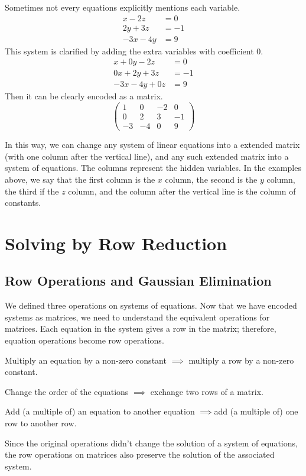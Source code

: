 \documentclass[fleqn]{report}
\begin{document}
\begin{example}
Sometimes not every equations explicitly mentions each variable. 
\begin{align*}
x-2z & = 0 \\
2y + 3z & = - 1\\
-3x - 4y & = 9
\end{align*}
This system is clarified by adding the extra
variables with coefficient $0$.
\begin{align*}
x + 0y -2z & = 0 \\
0x + 2y + 3z & = - 1\\
-3x - 4y + 0z & = 9
\end{align*}
Then it can be clearly encoded as a matrix.
\begin{displaymath}
\left(
\begin{array}{ccc|c}
1 & 0 & -2 & 0 \\
0 & 2 & 3 & -1 \\
-3 & -4 & 0 & 9 
\end{array}
\right)
\end{displaymath}
\end{example}

In this way, we can change any system of linear equations into a
extended matrix (with one column after the vertical line), and
any such extended matrix into a system of equations. The
columns represent the hidden variables. In the examples above, we say
that the first column is the $x$ column, the second is the $y$
column, the third if the $z$ column, and the column after the
vertical line is the column of constants.

\chapter{Solving by Row Reduction}
\label{row_reduction}

\section{Row Operations and Gaussian Elimination}

We defined three operations on systems of equations.
Now that we have encoded systems as matrices, we need to
understand the equivalent operations for matrices. Each equation in the
system gives a row in the matrix; therefore, equation
operations become row operations. 
\begin{smallitemize}
\item Multiply an equation by a non-zero constant $\implies$ multiply a
row by a non-zero constant.
\item Change the order of the equations $\implies$ exchange two
rows of a matrix.
\item Add (a multiple of) an equation to another equation
$\implies $add (a multiple of) one row to another row.
\end{smallitemize}
Since the original operations didn't change the solution of a system of
equations, the row operations on matrices also preserve the
solution of the associated system.
\end{document}
